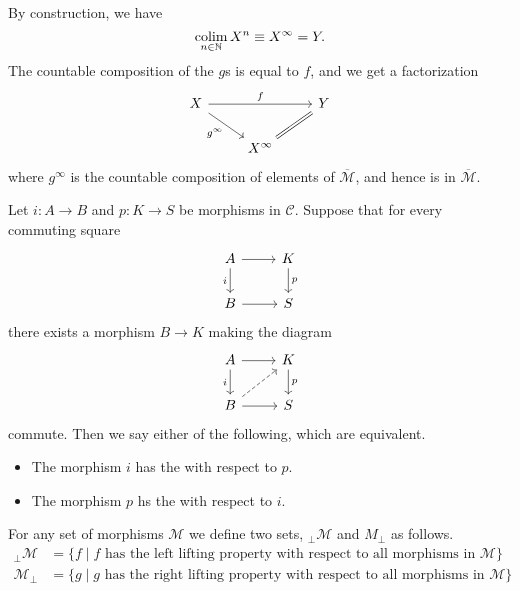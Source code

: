 \documentclass[main.tex]{subfiles}
\begin{document}
\begin{example}
  By construction, we have
  \begin{equation*}
    \operatorname*{colim}_{n \in \mathbb{N}} X^{n} \equiv X^{\infty} = Y.
  \end{equation*}
  The countable composition of the $g$s is equal to $f$, and we get a factorization
  \begin{equation*}
    \begin{tikzcd}
      X
      \arrow[rr, "f"]
      \arrow[dr, swap, "g^{\infty}"]
      && Y
      \\
      & X^{\infty}
      \arrow[ur, swap, equals]
    \end{tikzcd}
  \end{equation*}
  where $g^{\infty}$ is the countable composition of elements of $\overline{\mathcal{M}}$, and hence is in $\overline{\mathcal{M}}$.
\end{example}

\begin{definition}
  \label{def:lifting_property}
  Let $i\colon A \to B$ and $p\colon K \to S$ be morphisms in $\mathcal{C}$. Suppose that for every commuting square
  \begin{equation*}
    \begin{tikzcd}
      A
      \arrow[r]
      \arrow[d, swap, "i"]
      & K
      \arrow[d, "p"]
      \\
      B
      \arrow[r]
      & S
    \end{tikzcd}
  \end{equation*}
  there exists a morphism $B \to K$ making the diagram
  \begin{equation*}
    \begin{tikzcd}
      A
      \arrow[r]
      \arrow[d, swap, "i"]
      & K
      \arrow[d, "p"]
      \\
      B
      \arrow[ur, dashed]
      \arrow[r]
      & S
    \end{tikzcd}
  \end{equation*}
  commute. Then we say either of the following, which are equivalent.
  \begin{itemize}
    \item The morphism $i$ has the  with respect to $p$.

    \item The morphism $p$ hs the  with respect to $i$.
  \end{itemize}

  For any set of morphisms $\mathcal{M}$ we define two sets, $_{\perp}\mathcal{M}$ and $M_{\perp}$ as follows.
  \begin{align*}
    {}_{\perp}\mathcal{M} &= \{f \mid f \text{ has the left lifting property with respect to all morphisms in $\mathcal{M}$}\} \\
    \mathcal{M}_{\perp} &= \{g \mid g \text{ has the right lifting property with respect to all morphisms in $\mathcal{M}$}\} \\
  \end{align*}
\end{definition}
\end{document}
